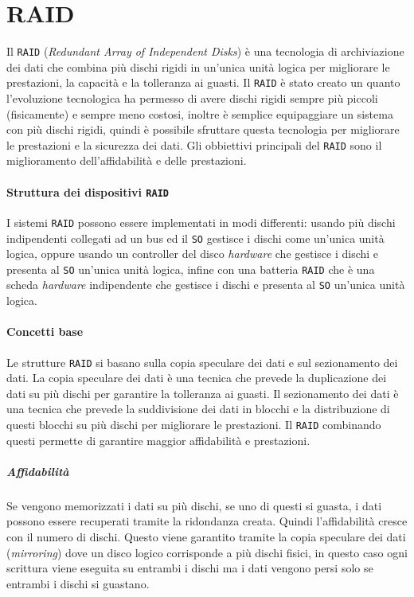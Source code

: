 \chapter{RAID}

Il \texttt{RAID} (\textit{Redundant Array of Independent Disks}) è una tecnologia di archiviazione dei dati che combina più dischi rigidi in un'unica unità logica per migliorare le prestazioni, la capacità e la tolleranza ai guasti. Il \texttt{RAID} è stato creato un quanto l'evoluzione tecnologica ha permesso di avere dischi rigidi sempre più piccoli (fisicamente) e sempre meno costosi, inoltre è semplice equipaggiare un sistema con più dischi rigidi, quindi è possibile sfruttare questa tecnologia per migliorare le prestazioni e la sicurezza dei dati.\newline
Gli obbiettivi principali del \texttt{RAID} sono il miglioramento dell'affidabilità e delle prestazioni. 
\subsubsection{Struttura dei dispositivi \texttt{RAID}}
    I sistemi \texttt{RAID} possono essere implementati in modi differenti: usando più dischi indipendenti collegati ad un bus ed il \texttt{SO} gestisce i dischi come un'unica unità logica, oppure usando un controller del disco \textit{hardware} che gestisce i dischi e presenta al \texttt{SO} un'unica unità logica, infine con una batteria \texttt{RAID} che è una scheda \textit{hardware} indipendente che gestisce i dischi e presenta al \texttt{SO} un'unica unità logica.
\subsubsection{Concetti base}
    Le strutture \texttt{RAID} si basano sulla copia speculare dei dati e sul sezionamento dei dati. La copia speculare dei dati è una tecnica che prevede la duplicazione dei dati su più dischi per garantire la tolleranza ai guasti. Il sezionamento dei dati è una tecnica che prevede la suddivisione dei dati in blocchi e la distribuzione di questi blocchi su più dischi per migliorare le prestazioni. Il \texttt{RAID} combinando questi permette di garantire maggior affidabilità e prestazioni.
    \paragraph{Affidabilità} Se vengono memorizzati i dati su più dischi, se uno di questi si guasta, i dati possono essere recuperati tramite la ridondanza creata. Quindi l'affidabilità cresce con il numero di dischi. Questo viene garantito tramite la copia speculare dei dati (\textit{mirroring}) dove un disco logico corrisponde a più dischi fisici, in questo caso ogni scrittura viene eseguita su entrambi i dischi ma i dati vengono persi solo se entrambi i dischi si guastano.
